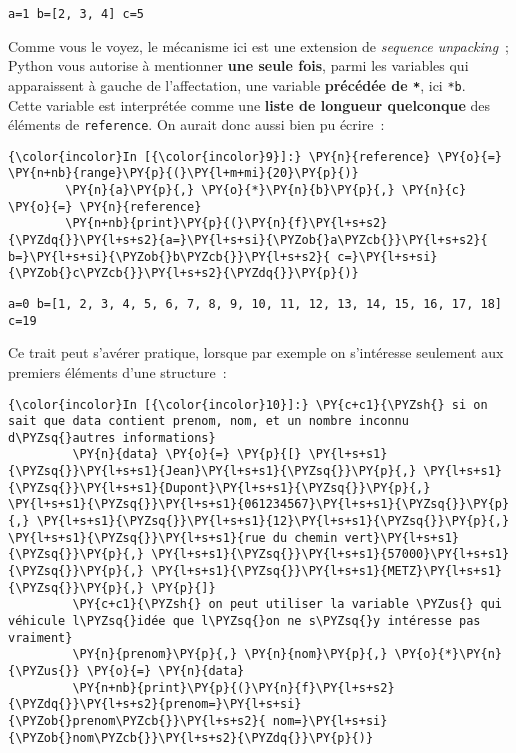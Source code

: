     \begin{Verbatim}[commandchars=\\\{\}]
a=1 b=[2, 3, 4] c=5

    \end{Verbatim}

    Comme vous le voyez, le mécanisme ici est une extension de
\emph{sequence unpacking}~; Python vous autorise à mentionner
\textbf{une seule fois}, parmi les variables qui apparaissent à gauche
de l'affectation, une variable \textbf{précédée de \texttt{*}}, ici
\texttt{*b}.\\

Cette variable est interprétée comme une \textbf{liste de longueur
quelconque} des éléments de \texttt{reference}. On aurait donc aussi
bien pu écrire~:

    \begin{Verbatim}[commandchars=\\\{\}]
{\color{incolor}In [{\color{incolor}9}]:} \PY{n}{reference} \PY{o}{=} \PY{n+nb}{range}\PY{p}{(}\PY{l+m+mi}{20}\PY{p}{)}
        \PY{n}{a}\PY{p}{,} \PY{o}{*}\PY{n}{b}\PY{p}{,} \PY{n}{c} \PY{o}{=} \PY{n}{reference}
        \PY{n+nb}{print}\PY{p}{(}\PY{n}{f}\PY{l+s+s2}{\PYZdq{}}\PY{l+s+s2}{a=}\PY{l+s+si}{\PYZob{}a\PYZcb{}}\PY{l+s+s2}{ b=}\PY{l+s+si}{\PYZob{}b\PYZcb{}}\PY{l+s+s2}{ c=}\PY{l+s+si}{\PYZob{}c\PYZcb{}}\PY{l+s+s2}{\PYZdq{}}\PY{p}{)}
\end{Verbatim}


    \begin{Verbatim}[commandchars=\\\{\}]
a=0 b=[1, 2, 3, 4, 5, 6, 7, 8, 9, 10, 11, 12, 13, 14, 15, 16, 17, 18] c=19

    \end{Verbatim}

    Ce trait peut s'avérer pratique, lorsque par exemple on s'intéresse
seulement aux premiers éléments d'une structure~:

    \begin{Verbatim}[commandchars=\\\{\}]
{\color{incolor}In [{\color{incolor}10}]:} \PY{c+c1}{\PYZsh{} si on sait que data contient prenom, nom, et un nombre inconnu d\PYZsq{}autres informations}
         \PY{n}{data} \PY{o}{=} \PY{p}{[} \PY{l+s+s1}{\PYZsq{}}\PY{l+s+s1}{Jean}\PY{l+s+s1}{\PYZsq{}}\PY{p}{,} \PY{l+s+s1}{\PYZsq{}}\PY{l+s+s1}{Dupont}\PY{l+s+s1}{\PYZsq{}}\PY{p}{,} \PY{l+s+s1}{\PYZsq{}}\PY{l+s+s1}{061234567}\PY{l+s+s1}{\PYZsq{}}\PY{p}{,} \PY{l+s+s1}{\PYZsq{}}\PY{l+s+s1}{12}\PY{l+s+s1}{\PYZsq{}}\PY{p}{,} \PY{l+s+s1}{\PYZsq{}}\PY{l+s+s1}{rue du chemin vert}\PY{l+s+s1}{\PYZsq{}}\PY{p}{,} \PY{l+s+s1}{\PYZsq{}}\PY{l+s+s1}{57000}\PY{l+s+s1}{\PYZsq{}}\PY{p}{,} \PY{l+s+s1}{\PYZsq{}}\PY{l+s+s1}{METZ}\PY{l+s+s1}{\PYZsq{}}\PY{p}{,} \PY{p}{]}
         \PY{c+c1}{\PYZsh{} on peut utiliser la variable \PYZus{} qui véhicule l\PYZsq{}idée que l\PYZsq{}on ne s\PYZsq{}y intéresse pas vraiment}
         \PY{n}{prenom}\PY{p}{,} \PY{n}{nom}\PY{p}{,} \PY{o}{*}\PY{n}{\PYZus{}} \PY{o}{=} \PY{n}{data}
         \PY{n+nb}{print}\PY{p}{(}\PY{n}{f}\PY{l+s+s2}{\PYZdq{}}\PY{l+s+s2}{prenom=}\PY{l+s+si}{\PYZob{}prenom\PYZcb{}}\PY{l+s+s2}{ nom=}\PY{l+s+si}{\PYZob{}nom\PYZcb{}}\PY{l+s+s2}{\PYZdq{}}\PY{p}{)}
\end{Verbatim}


